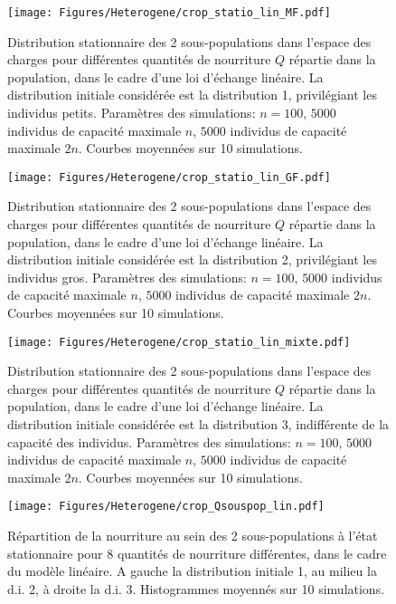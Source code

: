 \begin{figure}[h!]
\centering
\texttt{[image: Figures/Heterogene/crop\_statio\_lin\_MF.pdf]}
\caption{Distribution stationnaire des 2 sous-populations dans l'espace des charges pour différentes quantités de nourriture $Q$ répartie dans la population, dans le cadre d'une loi d'échange linéaire. La distribution initiale considérée est la distribution 1, privilégiant les individus petits. Paramètres des simulations: $n=100$, $5000$ individus de capacité maximale $n$, $5000$ individus de capacité maximale $2n$. Courbes moyennées sur 10 simulations.}
\label{statio_lin_MF}
\end{figure}

\begin{figure}[h!]
\centering
\texttt{[image: Figures/Heterogene/crop\_statio\_lin\_GF.pdf]}
\caption{Distribution stationnaire des 2 sous-populations dans l'espace des charges pour différentes quantités de nourriture $Q$ répartie dans la population, dans le cadre d'une loi d'échange linéaire. La distribution initiale considérée est la distribution 2, privilégiant les individus gros. Paramètres des simulations: $n=100$, $5000$ individus de capacité maximale $n$, $5000$ individus de capacité maximale $2n$. Courbes moyennées sur 10 simulations.}
\label{statio_lin_GF}
\end{figure}

\begin{figure}[h!]
\centering
\texttt{[image: Figures/Heterogene/crop\_statio\_lin\_mixte.pdf]}
\caption{Distribution stationnaire des 2 sous-populations dans l'espace des charges pour différentes quantités de nourriture $Q$ répartie dans la population, dans le cadre d'une loi d'échange linéaire. La distribution initiale considérée est la distribution 3, indifférente de la capacité des individus. Paramètres des simulations: $n=100$, $5000$ individus de capacité maximale $n$, $5000$ individus de capacité maximale $2n$. Courbes moyennées sur 10 simulations.}
\label{statio_lin_mixte}
\end{figure}


\begin{figure}[h!]
\centering
\texttt{[image: Figures/Heterogene/crop\_Qsouspop\_lin.pdf]}
\caption{Répartition de la nourriture au sein des 2 sous-populations à l'état stationnaire pour 8 quantités de nourriture différentes, dans le cadre du modèle linéaire. A gauche la distribution initiale 1, au milieu la d.i. 2, à droite la d.i. 3. Histogrammes moyennés sur 10 simulations.}
\label{Qsouspop_lin}
\end{figure}


